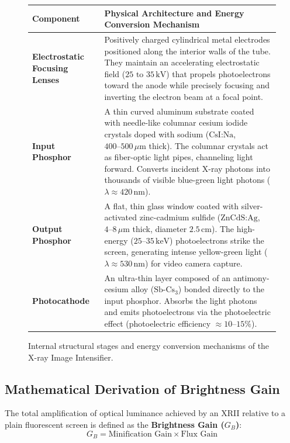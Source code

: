 \documentclass[11pt,a4paper]{article}
\begin{document}
\begin{figure}[htbp]
\centering
\setlength{\tabcolsep}{4pt}
\begin{tabular}{p{4.0cm}p{10.8cm}}
\toprule
\textbf{Component} & \textbf{Physical Architecture and Energy Conversion Mechanism} \\
\midrule
\textbf{Electrostatic Focusing Lenses} & Positively charged cylindrical metal electrodes positioned along the interior walls of the tube. They maintain an accelerating electrostatic field ($25\text{ to }35\,\text{kV}$) that propels photoelectrons toward the anode while precisely focusing and inverting the electron beam at a focal point. \\
\addlinespace
\textbf{Input Phosphor} & A thin curved aluminum substrate coated with needle-like columnar cesium iodide crystals doped with sodium ($\text{CsI:Na}$, $400\text{--}500\,\mu\text{m}$ thick). The columnar crystals act as fiber-optic light pipes, channeling light forward. Converts incident X-ray photons into thousands of visible blue-green light photons ($\lambda \approx 420\,\text{nm}$). \\
\addlinespace
\textbf{Output Phosphor} & A flat, thin glass window coated with silver-activated zinc-cadmium sulfide ($\text{ZnCdS:Ag}$, $4\text{--}8\,\mu\text{m}$ thick, diameter $2.5\,\text{cm}$). The high-energy ($25\text{--}35\,\text{keV}$) photoelectrons strike the screen, generating intense yellow-green light ($\lambda \approx 530\,\text{nm}$) for video camera capture. \\
\addlinespace
\textbf{Photocathode} & An ultra-thin layer composed of an antimony-cesium alloy ($\text{Sb-Cs}_3$) bonded directly to the input phosphor. Absorbs the light photons and emits photoelectrons via the photoelectric effect (photoelectric efficiency $\approx 10\text{--}15\%$). \\
\bottomrule
\end{tabular}
\caption{Internal structural stages and energy conversion mechanisms of the X-ray Image Intensifier.}
\label{tab:xrii_components}
\end{figure}

\subsection{Mathematical Derivation of Brightness Gain}

The total amplification of optical luminance achieved by an XRII relative to a plain fluorescent screen is defined as the \textbf{Brightness Gain ($G_B$)}:
\begin{equation}
    G_B = \text{Minification Gain} \times \text{Flux Gain}
\end{equation}
\end{document}
